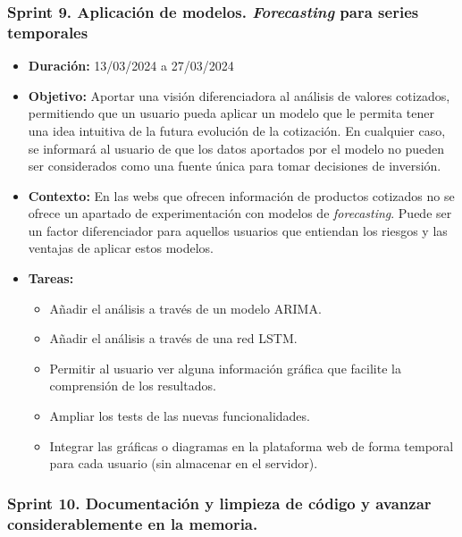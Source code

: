 \newpage
\subsubsection{Sprint 9. Aplicación de modelos. \emph{Forecasting} para series temporales}


\begin{itemize}
\item  
\textbf{Duración:} 13/03/2024 a 27/03/2024

\item
\textbf{Objetivo:} Aportar una visión diferenciadora al análisis de valores cotizados, permitiendo que un usuario pueda aplicar un modelo que le permita tener una idea intuitiva de la futura evolución de la cotización. En cualquier caso, se informará al usuario de que los datos aportados por el modelo no pueden ser considerados como una fuente única para tomar decisiones de inversión. 


\item
\textbf{Contexto:} En las webs que ofrecen información de productos cotizados no se ofrece un apartado de experimentación con modelos de \emph{forecasting}. Puede ser un factor diferenciador para aquellos usuarios que entiendan los riesgos y las ventajas de aplicar estos modelos.  


\item
\textbf{Tareas:}
	\begin{itemize}
	\tightlist
	\item 
	Añadir el análisis a través de un modelo ARIMA. 
	\item
	Añadir el análisis a través de una red LSTM. 
	\item
	Permitir al usuario ver alguna información gráfica que facilite la comprensión de los resultados. 
	\item
	Ampliar los tests de las nuevas funcionalidades. 
	\item
	Integrar las gráficas o diagramas en la plataforma web de forma temporal para cada usuario (sin almacenar en el servidor).
  	\end{itemize}
\end{itemize}


\subsubsection{Sprint 10. Documentación y limpieza de código y avanzar considerablemente en la memoria.}

